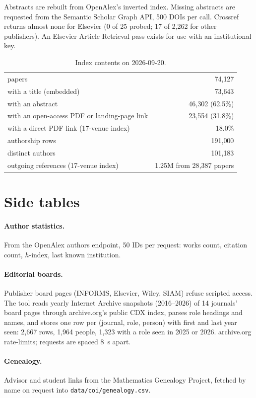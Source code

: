 \documentclass[11pt]{article}
\begin{document}
Abstracts are rebuilt from OpenAlex's inverted index. Missing abstracts are requested from the Semantic Scholar Graph API, 500 DOIs per call. Crossref returns almost none for Elsevier (0 of 25 probed; 17 of 2{,}262 for other publishers). An Elsevier Article Retrieval pass exists for use with an institutional key.

\begin{table}[h]\centering\small
\begin{tabular}{lr}\toprule
papers & 74{,}127 \\
with a title (embedded) & 73{,}643 \\
with an abstract & 46{,}302 (62.5\%) \\
with an open-access PDF or landing-page link & 23{,}554 (31.8\%) \\
with a direct PDF link (17-venue index) & 18.0\% \\
authorship rows & 191{,}000 \\
distinct authors & 101{,}183 \\
outgoing references (17-venue index) & 1.25M from 28{,}387 papers \\
\bottomrule\end{tabular}
\caption{Index contents on 2026-09-20.}\end{table}

\section{Side tables}\label{app:side}
\paragraph{Author statistics.} From the OpenAlex authors endpoint, 50 IDs per request: works count, citation count, $h$-index, last known institution.
\paragraph{Editorial boards.} Publisher board pages (INFORMS, Elsevier, Wiley, SIAM) refuse scripted access. The tool reads yearly Internet Archive snapshots (2016--2026) of 14 journals' board pages through archive.org's public CDX index, parses role headings and names, and stores one row per (journal, role, person) with first and last year seen: 2{,}667 rows, 1{,}964 people, 1{,}323 with a role seen in 2025 or 2026. archive.org rate-limits; requests are spaced 8~s apart.
\paragraph{Genealogy.} Advisor and student links from the Mathematics Genealogy Project, fetched by name on request into \texttt{data/coi/genealogy.csv}.
\end{document}
